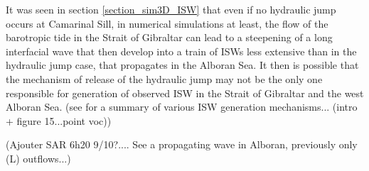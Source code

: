 It was seen in section \ref{section_sim3D_ISW} that even if no hydraulic jump occurs at Camarinal Sill, in numerical simulations at least, the flow of the barotropic tide in the Strait of Gibraltar can lead to a steepening of a long interfacial wave that then develop into a train of ISWs less extensive than in the hydraulic jump case, that propagates in the Alboran Sea. It then is possible that the mechanism of release of the hydraulic jump may not be the only one responsible for generation of observed ISW in the Strait of Gibraltar and the west Alboran Sea. (see \citet{chen_2017} for a summary of various ISW generation mechanisms... (intro + figure 15...point voc))

(Ajouter SAR 6h20 9/10?.... See a propagating wave in Alboran, previously only (L) outflows...)





